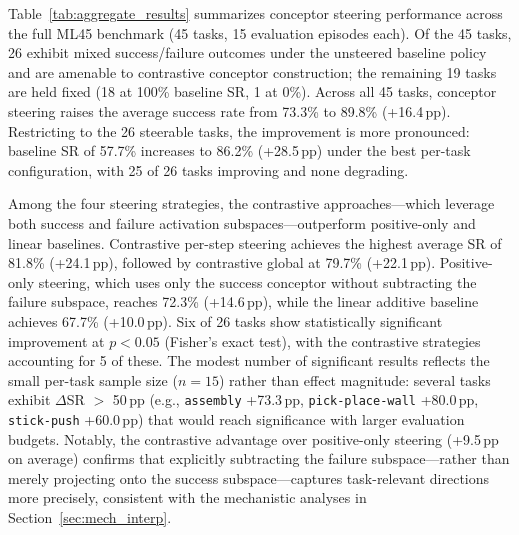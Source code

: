 
Table~\ref{tab:aggregate_results} summarizes conceptor steering performance across the full ML45 benchmark (45 tasks, 15 evaluation episodes each).
Of the 45 tasks, 26 exhibit mixed success/failure outcomes under the unsteered baseline policy and are amenable to contrastive conceptor construction; the remaining 19 tasks are held fixed (18 at 100\% baseline SR, 1 at 0\%).
Across all 45 tasks, conceptor steering raises the average success rate from 73.3\% to 89.8\% (+16.4\,pp).
Restricting to the 26 steerable tasks, the improvement is more pronounced: baseline SR of 57.7\% increases to 86.2\% (+28.5\,pp) under the best per-task configuration, with 25 of 26 tasks improving and none degrading.

Among the four steering strategies, the contrastive approaches---which leverage both success and failure activation subspaces---outperform positive-only and linear baselines.
Contrastive per-step steering achieves the highest average SR of 81.8\% (+24.1\,pp), followed by contrastive global at 79.7\% (+22.1\,pp).
Positive-only steering, which uses only the success conceptor without subtracting the failure subspace, reaches 72.3\% (+14.6\,pp), while the linear additive baseline achieves 67.7\% (+10.0\,pp).
Six of 26 tasks show statistically significant improvement at $p<0.05$ (Fisher's exact test), with the contrastive strategies accounting for 5 of these.
The modest number of significant results reflects the small per-task sample size ($n=15$) rather than effect magnitude: several tasks exhibit $\Delta$SR $>$ 50\,pp (e.g., \texttt{assembly} +73.3\,pp, \texttt{pick-place-wall} +80.0\,pp, \texttt{stick-push} +60.0\,pp) that would reach significance with larger evaluation budgets.
Notably, the contrastive advantage over positive-only steering (+9.5\,pp on average) confirms that explicitly subtracting the failure subspace---rather than merely projecting onto the success subspace---captures task-relevant directions more precisely, consistent with the mechanistic analyses in Section~\ref{sec:mech_interp}.